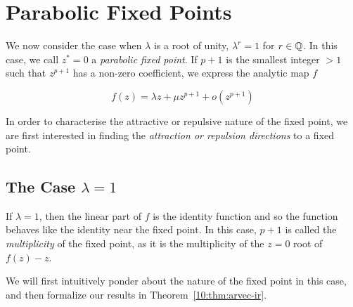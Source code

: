 \documentclass[../main.tex]{subfiles}
\begin{document}
\section{Parabolic Fixed Points}
\label{sec:10}

We now consider the case when $\lambda$ is a root of unity, $\lambda^r=1$ for $r \in \mathbb{Q}$. In this case, we call $z^*=0$ a \emph{parabolic fixed point}. If $p+1$ is the smallest integer $> 1$ such that $z^{p+1}$ has a non-zero coefficient, we express the analytic map $f$

\begin{equation}
    \label{10:eq:f}
    f(z) = \lambda z + \mu z^{p + 1} + o(z^{p+1})
\end{equation}

In order to characterise the attractive or repulsive nature of the fixed point, we are first interested in finding the \emph{attraction or repulsion directions} to a fixed point.

\subsection{The Case $\lambda = 1$}
If $\lambda = 1$, then the linear part of $f$ is the identity function and so the function behaves like the identity near the fixed point. In this case, $p+1$ is called the \emph{multiplicity} of the fixed point, as it is the multiplicity of the $z=0$ root of $f(z)-z$.

We will first intuitively ponder about the nature of the fixed point in this case, and then formalize our results in Theorem~\ref{10:thm:arvec-ir}.%
\end{document}
